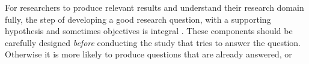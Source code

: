 For researchers to produce relevant results and understand their research domain fully, the step of developing a good research question, with a supporting hypothesis and sometimes objectives is integral \cite{Farrugia2009}. These components should be carefully designed \emph{before} conducting the study that tries to answer the question. Otherwise it is more likely to produce questions that are already answered, or  \cite[p. 280]{Farrugia2009} 



